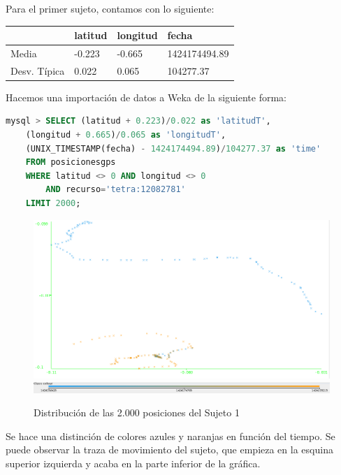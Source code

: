 \documentclass[a4paper, 12pt, spanish]{article}
\begin{document}
Para el primer sujeto, contamos con lo siguiente:\\

	\begin{tabular}{|l|l|l|l|}
	\rowcolor{LightCyan}
	\hline
		& latitud & longitud & fecha\\
	\hline
		Media & -0.223 & -0.665 & 1424174494.89 \\
		Desv. T\'ipica & 0.022 & 0.065	& 104277.37 \\
	\hline
	\end{tabular}
	
%	
	
\bigskip

Hacemos una importaci\'on de datos a Weka de la siguiente forma:\\

\begin{lstlisting}[language=sql, columns=fullflexible, basicstyle=\small, frame=tblr]
mysql > SELECT (latitud + 0.223)/0.022 as 'latitudT', 
	(longitud + 0.665)/0.065 as 'longitudT',
	(UNIX_TIMESTAMP(fecha) - 1424174494.89)/104277.37 as 'time'
	FROM posicionesgps
	WHERE latitud <> 0 AND longitud <> 0 
		AND recurso='tetra:12082781'
	LIMIT 2000;
\end{lstlisting}

\begin{figure}[H]
	\includegraphics[scale=.5]{../comparativa/sujeto1.png}
	\includegraphics[scale=.4]{../comparativa/leyenda.png}
	\caption{Distribuci\'on de las 2.000 posiciones del Sujeto 1}
\end{figure}

Se hace una distinci\'on de colores azules y naranjas en funci\'on del tiempo. Se puede observar la traza de movimiento del sujeto, que empieza en la esquina superior izquierda y acaba en la parte inferior de la gr\'afica. \\
\end{document}
